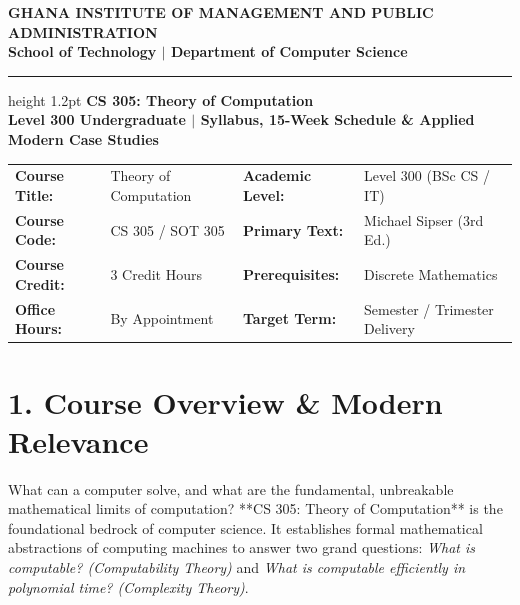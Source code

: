 \documentclass[11pt,a4paper]{article}
\begin{document}
\begin{center}
    {\Large \textbf{\color{gimpanavy}GHANA INSTITUTE OF MANAGEMENT AND PUBLIC ADMINISTRATION}}\\
    \vspace{2pt}
    {\large \textbf{\color{gimpaaccent}School of Technology $|$ Department of Computer Science}}\\
    \vspace{5pt}
    \hrule height 1.2pt \color{gimpanavy}
    \vspace{6pt}
    {\LARGE \textbf{\color{gimpanavy}CS 305: Theory of Computation}}\\
    \vspace{3pt}
    {\large \textbf{Level 300 Undergraduate $|$ Syllabus, 15-Week Schedule \& Applied Modern Case Studies}}
    \vspace{3pt}
\end{center}

\begin{tcolorbox}[title=Course Specifications]
\begin{tabularx}{\linewidth}{@{} l X l X @{}}
    \textbf{Course Title:}   & Theory of Computation & \textbf{Academic Level:} & Level 300 (BSc CS / IT) \\
    \textbf{Course Code:}    & CS 305 / SOT 305      & \textbf{Primary Text:}   & Michael Sipser (3rd Ed.) \\
    \textbf{Course Credit:}  & 3 Credit Hours        & \textbf{Prerequisites:}  & Discrete Mathematics \\
    \textbf{Office Hours:}   & By Appointment        & \textbf{Target Term:}    & Semester / Trimester Delivery
\end{tabularx}
\end{tcolorbox}

\vspace{-2pt}

\section*{1. Course Overview \& Modern Relevance}
What can a computer solve, and what are the fundamental, unbreakable mathematical limits of computation? **CS 305: Theory of Computation** is the foundational bedrock of computer science. It establishes formal mathematical abstractions of computing machines to answer two grand questions: \textit{What is computable? (Computability Theory)} and \textit{What is computable efficiently in polynomial time? (Complexity Theory)}.
\end{document}

